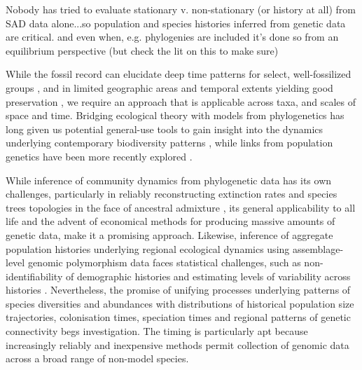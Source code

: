 \documentclass[12pt]{article}
\begin{document}

Nobody has tried to evaluate stationary v. non-stationary (or history at
all) from SAD data alone...so population and species histories inferred
from genetic data are critical. and even when, e.g. phylogenies are
included it's done so from an equilibrium perspective (but check the lit
on this to make sure)

While the fossil record can elucidate deep time patterns for select,
well-fossilized groups \cite{Alroy2008-no}, and in limited geographic
areas and temporal extents yielding good preservation
\cite{Harnik2011-qe}, we require an approach that is applicable across
taxa, and scales of space and time. Bridging ecological theory with
models from phylogenetics has long given us potential general-use
tools to gain insight into the dynamics underlying contemporary
biodiversity patterns \cite{Webb2002-yr, Emerson2002-mw,
  Lavergne2010-ts}, while links from population genetics have been
more recently explored \cite{Webb2002-yr, Emerson2002-mw,
  Lavergne2010-ts, Li2016-ns, McGaughran2015-sy, Laroche2015-qo,
  Vanoverbeke2015-ym, Vellend2005-qd,
  Papadopoulou2011-bd,Dexter2012-rn}.

While inference of community dynamics from phylogenetic data has its
own challenges, particularly in reliably reconstructing extinction
rates \cite{Quental2009-jf} and species trees topologies in the face
of ancestral admixture \cite{Mallet2016-iu,Xu2016-ql}, its general
applicability to all life and the advent of economical methods for
producing massive amounts of genetic data, make it a promising
approach.  Likewise, inference of aggregate population histories
underlying regional ecological dynamics using assemblage-level genomic
polymorphism data faces statistical challenges, such as
non-identifiability of demographic histories \cite{Terhorst2015-mt,
  Robinson2014-vy, Sousa2013-ox} and estimating levels of variability
across histories \cite{Hickerson2014-za}. Nevertheless, the promise of
unifying processes underlying patterns of species diversities and
abundances with distributions of historical population size
trajectories, colonisation times, speciation times and regional
patterns of genetic connectivity begs investigation. The timing is
particularly apt because increasingly reliably and inexpensive methods
permit collection of genomic data across a broad range of non-model
species.
\end{document}
